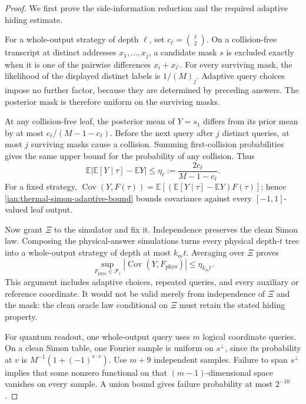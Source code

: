 \begin{proof}
We first prove the side-information reduction and the required
adaptive hiding estimate.

For a whole-output strategy of depth \(\ell\), set
\(c_\ell=\binom{\ell}{2}\).
On a collision-free transcript at distinct addresses
\(x_1,\ldots,x_j\), a candidate mask \(s\) is excluded exactly when it
is one of the pairwise differences \(x_i+x_{i'}\).
For every surviving mask, the likelihood of the displayed distinct
labels is \(1/(M)_j\). Adaptive query choices impose no further
factor, because they are determined by preceding answers.
The posterior mask is therefore uniform on the surviving masks.

At any collision-free leaf, the posterior mean of \(Y=s_1\)
differs from its prior mean by at most
\(c_\ell/(M-1-c_\ell)\).
Before the next query after \(j\) distinct queries, at most \(j\)
surviving masks cause a collision. Summing first-collision
probabilities gives the same upper bound for the probability of any
collision. Thus
\[
 \mathbb E\left|
       \mathbb E[Y\mid\tau]-\mathbb EY
       \right|
 \le\eta_\ell:=
       \frac{2c_\ell}{M-1-c_\ell}.
 \tag{36.30}\label{ian:thermal-simon-adaptive-bound}
\]
For a fixed strategy,
\(\operatorname{Cov}(Y,F(\tau))
=\mathbb E[(\mathbb E[Y\mid\tau]-\mathbb EY)F(\tau)]\);
hence \eqref{ian:thermal-simon-adaptive-bound} bounds covariance
against every \([-1,1]\)-valued leaf output.

Now grant \(\Xi\) to the simulator and fix it. Independence preserves
the clean Simon law. Composing the physical-answer simulations turns
every physical depth-\(t\) tree into a whole-output strategy of depth
at most \(k_mt\). Averaging over \(\Xi\) proves
\[
 \sup_{F_{\mathrm{phys}}\in\mathcal F_t}
 |\operatorname{Cov}(Y,F_{\mathrm{phys}})|
 \le\eta_{k_mt}.
 \tag{36.31}
\]
This argument includes adaptive choices, repeated queries, and every
auxiliary or reference coordinate. It would not be valid merely
from independence of \(\Xi\) and the mask: the clean oracle law
conditional on \(\Xi\) must retain the stated hiding property.

For quantum readout, one whole-output query uses \(m\) logical
coordinate queries. On a clean Simon table, one Fourier sample is
uniform on \(s^\perp\), since its probability at \(v\) is
\(M^{-1}(1+(-1)^{s\cdot v})\).
Use \(m+9\) independent samples. Failure to span \(s^\perp\) implies
that some nonzero functional on that \((m-1)\)-dimensional space
vanishes on every sample. A union bound gives failure probability
at most \(2^{-10}\).


\end{proof}
